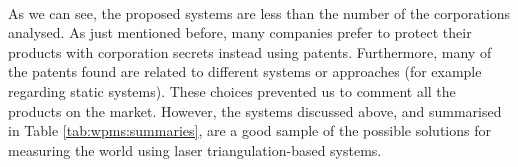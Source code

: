 ~\\

As we can see, the proposed systems are less than the number of the corporations analysed. As just mentioned before, many companies prefer to protect their products with corporation secrets instead using patents. Furthermore, many of the patents found are related to different systems or approaches (for example regarding static systems). These choices prevented us to comment all the products on the market. However, the systems discussed above, and summarised in Table \ref{tab:wpms:summaries}, are a good sample of the possible solutions for measuring the world using laser triangulation-based systems.
  
